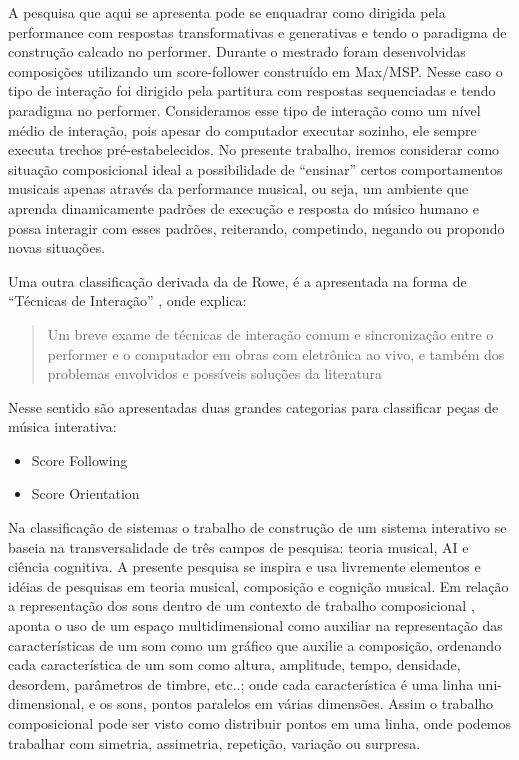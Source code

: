 \documentclass{ppgmus}
\begin{document}
A pesquisa que aqui se apresenta pode se enquadrar como dirigida pela
performance com respostas transformativas e generativas e tendo o
paradigma de construção calcado no performer. Durante o mestrado foram
desenvolvidas composições utilizando um score-follower construído em
Max/MSP. Nesse caso o tipo de interação foi dirigido pela partitura
com respostas sequenciadas e tendo paradigma no performer.
Consideramos esse tipo de interação como um nível médio de interação,
pois apesar do computador executar sozinho, ele sempre executa trechos
pré-estabelecidos. No presente trabalho, iremos considerar como
situação composicional ideal a possibilidade de “ensinar” certos
comportamentos musicais apenas através da performance musical, ou
seja, um ambiente que aprenda dinamicamente padrões de execução e
resposta do músico humano e possa interagir com esses padrões,
reiterando, competindo, negando ou propondo novas situações.

Uma outra classificação derivada da de Rowe, é a apresentada na forma
de ``Técnicas de Interação'' \cite{pestova:tese}, onde  explica:
\begin{quote}
 Um breve exame de técnicas de interação comum e sincronização entre o
performer e o computador em obras com eletrônica ao vivo, e também dos problemas
envolvidos e possíveis soluções da literatura
\end{quote} 

Nesse sentido são apresentadas duas grandes categorias para classificar peças
de música interativa:

\begin{itemize}
 \item Score Following
  \item Score Orientation
\end{itemize}








Na classificação de sistemas \cite{rowe93:interactive} o trabalho de construção de um sistema interativo se
baseia na transversalidade de  três campos de pesquisa: teoria
musical, AI e ciência cognitiva. A presente pesquisa se inspira e usa
livremente elementos e idéias de pesquisas em teoria musical,
composição e cognição musical. Em relação a representação dos sons
dentro de um contexto de trabalho composicional \cite{xenakis96:determinacy}, aponta o
uso de um espaço multidimensional como auxiliar na representação das
características de um som como um gráfico que auxilie a composição,
ordenando cada característica de um som  como altura, amplitude,
tempo, densidade, desordem, parâmetros de timbre, etc..; onde cada
característica é uma linha uni-dimensional, e os sons, pontos
paralelos em várias dimensões. Assim o trabalho composicional pode ser
visto como distribuir pontos em uma linha, onde podemos trabalhar com
simetria, assimetria, repetição, variação ou surpresa.
\end{document}
